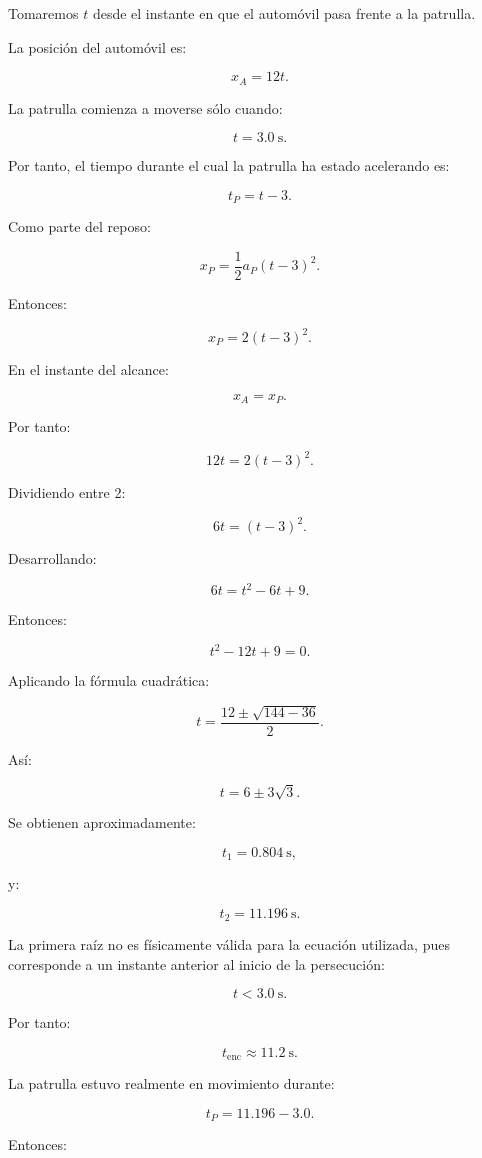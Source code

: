 \begin{explicacion}
Tomaremos \(t\) desde el instante en que el automóvil pasa frente a la patrulla.

La posición del automóvil es:

\[
x_A=12t.
\]

La patrulla comienza a moverse sólo cuando:

\[ t=\SI{3.0}{\second}. \]

Por tanto, el tiempo durante el cual la patrulla ha estado acelerando es:

\[ t_P=t-3. \]

Como parte del reposo:

\[
x_P
=
\frac{1}{2}a_P(t-3)^2.
\]

Entonces:

\[
x_P
=
2(t-3)^2.
\]

En el instante del alcance:

\[ x_A=x_P. \]

Por tanto:

\[
12t=2(t-3)^2.
\]

Dividiendo entre 2:

\[
6t=(t-3)^2.
\]

Desarrollando:

\[
6t=t^2-6t+9.
\]

Entonces:

\[
t^2-12t+9=0.
\]

Aplicando la fórmula cuadrática:

\[
t
=
\frac{12\pm\sqrt{144-36}}{2}.
\]

Así:

\[
t=6\pm3\sqrt{3}.
\]

Se obtienen aproximadamente:

\[
t_1=\SI{0.804}{\second},
\]

y:

\[
t_2=\SI{11.196}{\second}.
\]

La primera raíz no es físicamente válida para la ecuación utilizada, pues corresponde a un instante anterior al inicio de la persecución:

\[ t<\SI{3.0}{\second}. \]

Por tanto:

\[ \boxed{t_{\mathrm{enc}}\approx\SI{11.2}{\second}}. \]

La patrulla estuvo realmente en movimiento durante:

\[
t_P
=
11.196-3.0.
\]

Entonces:


\end{explicacion}

